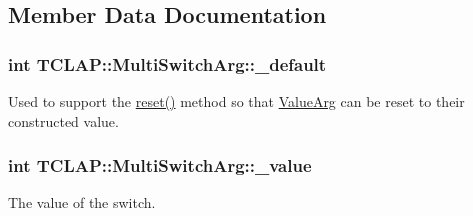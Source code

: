 \subsection{Member Data Documentation}
\hypertarget{class_t_c_l_a_p_1_1_multi_switch_arg_afcd5b3e418e455af3d31aec1e300bb74}{
\subsubsection[{\+\_\+default}]{\setlength{\rightskip}{0pt plus 5cm}int T\+C\+L\+A\+P\+::\+Multi\+Switch\+Arg\+::\+\_\+default\hspace{0.3cm}{\ttfamily [protected]}}}\label{class_t_c_l_a_p_1_1_multi_switch_arg_afcd5b3e418e455af3d31aec1e300bb74}
Used to support the \hyperlink{class_t_c_l_a_p_1_1_multi_switch_arg_ac320530811dbca7fdcb2a41ab252fce4}{reset()} method so that \hyperlink{class_t_c_l_a_p_1_1_value_arg}{Value\+Arg} can be reset to their constructed value. \hypertarget{class_t_c_l_a_p_1_1_multi_switch_arg_ab488d4bcdde96fc9edea87ee9b6f5839}{
\subsubsection[{\+\_\+value}]{\setlength{\rightskip}{0pt plus 5cm}int T\+C\+L\+A\+P\+::\+Multi\+Switch\+Arg\+::\+\_\+value\hspace{0.3cm}{\ttfamily [protected]}}}\label{class_t_c_l_a_p_1_1_multi_switch_arg_ab488d4bcdde96fc9edea87ee9b6f5839}
The value of the switch. 